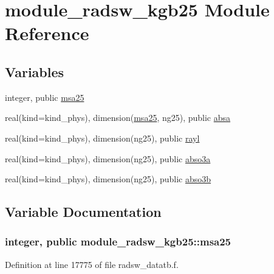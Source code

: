 \hypertarget{namespacemodule__radsw__kgb25}{}\section{module\+\_\+radsw\+\_\+kgb25 Module Reference}
\label{namespacemodule__radsw__kgb25}
\subsection*{Variables}
\begin{DoxyCompactItemize}
\item 
integer, public \hyperlink{namespacemodule__radsw__kgb25_afc06df1f3c3a0b2f3189424ed042973e}{msa25}
\item 
real(kind=kind\+\_\+phys), dimension(\hyperlink{namespacemodule__radsw__kgb25_afc06df1f3c3a0b2f3189424ed042973e}{msa25}, ng25), public \hyperlink{group__module__radsw__main_gaf4daf474954d4689219ada6d0662aceb}{absa}
\item 
real(kind=kind\+\_\+phys), dimension(ng25), public \hyperlink{group__module__radsw__main_ga3d32a0d74d03129cacd9c4bb2e58683a}{rayl}
\item 
real(kind=kind\+\_\+phys), dimension(ng25), public \hyperlink{group__module__radsw__main_gab02765dac8ca71a439cdaf1ed2691851}{abso3a}
\item 
real(kind=kind\+\_\+phys), dimension(ng25), public \hyperlink{group__module__radsw__main_ga2844cade392c8805b1d418bc1260b3a5}{abso3b}
\end{DoxyCompactItemize}


\subsection{Variable Documentation}
\subsubsection[{\texorpdfstring{msa25}{msa25}}]{\setlength{\rightskip}{0pt plus 5cm}integer, public module\+\_\+radsw\+\_\+kgb25\+::msa25}\hypertarget{namespacemodule__radsw__kgb25_afc06df1f3c3a0b2f3189424ed042973e}{}\label{namespacemodule__radsw__kgb25_afc06df1f3c3a0b2f3189424ed042973e}


Definition at line 17775 of file radsw\+\_\+datatb.\+f.

